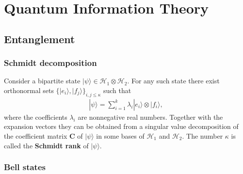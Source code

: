 \chapter{Quantum Information Theory}\label{chapter:quantum_computing}

\section{Entanglement}
\subsection{Schmidt decomposition}

    \begin{construct}
        Consider a bipartite state $|\psi\rangle\in\mathcal{H}_1\otimes\mathcal{H}_2$. For any such state there exist orthonormal sets $\big\{|e_i\rangle, |f_j\rangle\big\}_{i,j\leq\kappa}$ such that
        \begin{gather}
            |\psi\rangle = \sum_{i=1}^k\lambda_i|e_i\rangle\otimes|f_i\rangle,
        \end{gather}
        where the coefficients $\lambda_i$ are nonnegative real numbers. Together with the expansion vectors they can be obtained from a singular value decomposition of the coefficient matrix $\mathbf{C}$ of $|\psi\rangle$ in some bases of $\mathcal{H}_1$ and $\mathcal{H}_2$. The number $\kappa$ is called the \textbf{Schmidt rank} of $|\psi\rangle$.
    \end{construct}


\subsection{Bell states}

